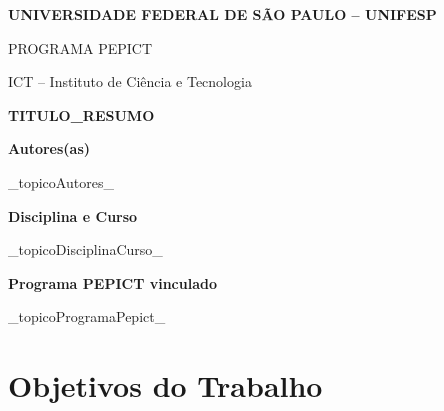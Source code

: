 \documentclass[12pt,a4paper]{article}
\begin{document}

\begin{center}

{\large \textbf{UNIVERSIDADE FEDERAL DE SÃO PAULO – UNIFESP}}

\vspace{0.3cm}

{\normalsize PROGRAMA PEPICT}

\vspace{0.3cm}

{\normalsize ICT – Instituto de Ciência e Tecnologia}

\vspace{1cm}

{\Large \textbf{TITULO_RESUMO}}

\end{center}

\vspace{1cm}


\noindent
\textbf{Autores(as)}

\_topicoAutores\_

\vspace{0.7cm}


\noindent
\textbf{Disciplina e Curso}

\_topicoDisciplinaCurso\_

\vspace{0.7cm}


\noindent
\textbf{Programa PEPICT vinculado}

\_topicoProgramaPepict\_

\vspace{0.7cm}


\section*{Objetivos do Trabalho}
\end{document}
